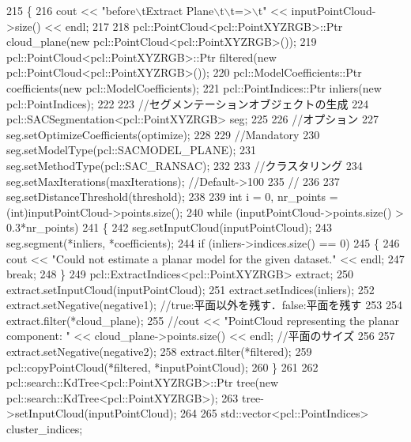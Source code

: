 \begin{DoxyCode}
215 \{
216     cout << \textcolor{stringliteral}{"before\(\backslash\)tExtract Plane\(\backslash\)t\(\backslash\)t=>\(\backslash\)t"} << inputPointCloud->size() << endl;
217 
218     pcl::PointCloud<pcl::PointXYZRGB>::Ptr cloud\_plane(\textcolor{keyword}{new} pcl::PointCloud<pcl::PointXYZRGB>());
219     pcl::PointCloud<pcl::PointXYZRGB>::Ptr filtered(\textcolor{keyword}{new} pcl::PointCloud<pcl::PointXYZRGB>());
220     pcl::ModelCoefficients::Ptr coefficients(\textcolor{keyword}{new} pcl::ModelCoefficients);
221     pcl::PointIndices::Ptr inliers(\textcolor{keyword}{new} pcl::PointIndices);
222 
223     \textcolor{comment}{//セグメンテーションオブジェクトの生成}
224     pcl::SACSegmentation<pcl::PointXYZRGB> seg;
225 
226     \textcolor{comment}{//オプション}
227     seg.setOptimizeCoefficients(optimize);
228 
229     \textcolor{comment}{//Mandatory}
230     seg.setModelType(pcl::SACMODEL\_PLANE);
231     seg.setMethodType(pcl::SAC\_RANSAC);
232 
233     \textcolor{comment}{//クラスタリング}
234     seg.setMaxIterations(maxIterations); \textcolor{comment}{//Default->100}
235     \textcolor{comment}{//}
236 
237     seg.setDistanceThreshold(threshold);
238 
239     \textcolor{keywordtype}{int} i = 0, nr\_points = (int)inputPointCloud->points.size();
240     \textcolor{keywordflow}{while} (inputPointCloud->points.size() > 0.3*nr\_points)
241     \{
242         seg.setInputCloud(inputPointCloud);
243         seg.segment(*inliers, *coefficients);
244         \textcolor{keywordflow}{if} (inliers->indices.size() == 0)
245         \{
246             cout << \textcolor{stringliteral}{"Could not estimate a planar model for the given dataset."} << endl;
247             \textcolor{keywordflow}{break};
248         \}
249         pcl::ExtractIndices<pcl::PointXYZRGB> extract;
250         extract.setInputCloud(inputPointCloud);
251         extract.setIndices(inliers);
252         extract.setNegative(negative1); \textcolor{comment}{//true:平面以外を残す．false:平面を残す}
253 
254         extract.filter(*cloud\_plane);
255         \textcolor{comment}{//cout << "PointCloud representing the planar component: " << cloud\_plane->points.size() << endl;
       //平面のサイズ}
256 
257         extract.setNegative(negative2);
258         extract.filter(*filtered);
259         pcl::copyPointCloud(*filtered, *inputPointCloud);
260     \}
261 
262     pcl::search::KdTree<pcl::PointXYZRGB>::Ptr tree(\textcolor{keyword}{new} pcl::search::KdTree<pcl::PointXYZRGB>);
263     tree->setInputCloud(inputPointCloud);
264 
265     std::vector<pcl::PointIndices> cluster\_indices;

\end{DoxyCode}
